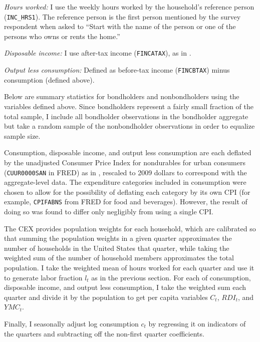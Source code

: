 \textit{Hours worked:} I use the weekly hours worked by the household's reference person (\texttt{INC\_HRS1}). The reference person is the first person mentioned by the survey respondent when asked to ``Start with the name of the person or one of the persons who owns or rents the home.''

\textit{Disposable income:}  I use after-tax income (\texttt{FINCATAX}), as in \cite{krueger15}.

\textit{Output less consumption:} Defined as before-tax income (\texttt{FINCBTAX}) minus consumption (defined above).

Below are summary statistics for bondholders and nonbondholders using the variables defined above. Since bondholders represent a fairly small fraction of the total sample, I include all bondholder observations in the bondholder aggregate but take a random sample of the nonbondholder observations in order to equalize sample size.

\begin{center}
\textbf{\color{red}{SUMMARY STATS TK}}
\end{center}

Consumption, disposable income, and output less consumption are each deflated by the unadjusted Consumer Price Index for nondurables for urban consumers (\texttt{CUUR0000SAN} in FRED) as in \cite{vissing02}, rescaled to 2009 dollars to correspond with the aggregate-level data. The expenditure categories included in consumption were chosen to allow for the possibility of deflating each category by its own CPI (for example, \texttt{CPIFABNS} from FRED for food and beverages). However, the result of doing so was found to differ only negligibly from using a single CPI.

The CEX provides population weights for each household, which are calibrated so that summing the population weights in a given quarter approximates the number of households in the United States that quarter, while taking the weighted sum of the number of household members approximates the total population. I take the weighted mean of hours worked for each quarter and use it to generate labor fraction $l_t$ as in the previous section. For each of consumption, disposable income, and output less consumption, I take the weighted sum each quarter and divide it by the population to get per capita variables $C_t$, $RDI_t$, and $YMC_t$.

Finally, I seasonally adjust log consumption $c_t$ by regressing it on indicators of the quarters and subtracting off the non-first quarter coefficients.